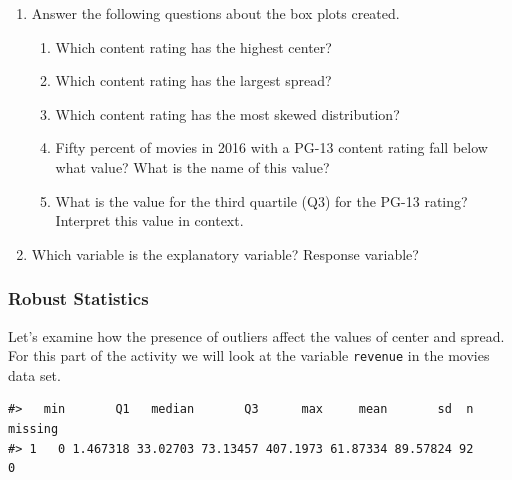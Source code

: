 \documentclass[
]{report}
\begin{document}
\begin{enumerate}
\def\labelenumi{\arabic{enumi}.}
\setcounter{enumi}{5}
\item
  Answer the following questions about the box plots created.

  \begin{enumerate}
  \def\labelenumii{\alph{enumii}.}
  \item
    Which content rating has the highest center?
    \vspace{0.2in}
  \item
    Which content rating has the largest spread?
    \vspace{0.2in}
  \item
    Which content rating has the most skewed distribution?
    \vspace{0.2in}
  \item
    Fifty percent of movies in 2016 with a PG-13 content rating fall below what value? What is the name of this value?
    \vspace{0.4in}
  \item
    What is the value for the third quartile (Q3) for the PG-13 rating? Interpret this value in context.
    \vspace{.8in}
  \end{enumerate}
\item
  Which variable is the explanatory variable? Response variable?
\end{enumerate}

\vspace{0.4in}

\hypertarget{robust-statistics}{%
\subsubsection{Robust Statistics}\label{robust-statistics}}

Let's examine how the presence of outliers affect the values of center and spread. For this part of the activity we will look at the variable \texttt{revenue} in the movies data set.

\begin{verbatim}
#>   min       Q1   median       Q3      max     mean       sd  n missing
#> 1   0 1.467318 33.02703 73.13457 407.1973 61.87334 89.57824 92       0
\end{verbatim}
\end{document}
